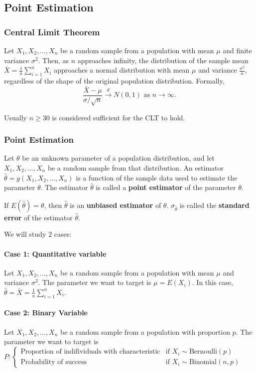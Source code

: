 \subsection{Point Estimation}
\hrulefill

\subsubsection*{Central Limit Theorem}
Let \(X_1, X_2, \ldots, X_n\) be a random sample from a population with mean \(\mu\) and finite variance \(\sigma^2\). 
Then, as \(n\) approaches infinity, the distribution of the sample mean \(\bar{X} = \frac{1}{n} \sum_{i=1}^{n} X_i\) 
approaches a normal distribution with mean \(\mu\) and variance \(\frac{\sigma^2}{n}\), regardless of the shape of the 
original population distribution. Formally,
\[
\frac{\bar{X} - \mu}{\sigma / \sqrt{n}} \xrightarrow{d} N(0, 1) \text{ as } n \to \infty.
\]

Usually $n \geq 30$ is considered sufficient for the CLT to hold.

\subsubsection*{Point Estimation}
Let $\theta$ be an unknown parameter of a population distribution, and let $X_1, X_2, \ldots, X_n$ be a random sample from that distribution.
An estimator $\hat{\theta} = g(X_1, X_2, \ldots, X_n)$ is a function of the sample data used to estimate the parameter $\theta$.
The estimator $\hat{\theta}$ is called a \textbf{point estimator} of the parameter $\theta$.

If $E(\hat{\theta}) = \theta$, then $\hat{\theta}$ is an \textbf{unbiased estimator} of $\theta$. $\sigma_{\hat{\theta}}$ is called the
\textbf{standard error} of the estimator $\hat{\theta}$.

We will study 2 cases:

\paragraph*{Case 1: Quantitative variable}
Let \(X_1, X_2, \ldots, X_n\) be a random sample from a population with mean \(\mu\) and variance \(\sigma^2\).
The parameter we want to target is $\mu = E(X_i)$. In this case, $\hat{\theta} = \bar{X} = \frac{1}{n} \sum_{i=1}^n X_i$.

\paragraph*{Case 2: Binary Variable}
Let \(X_1, X_2, \ldots, X_n\) be a random sample from a population with proportion \(p\).
The parameter we want to target is $P : \begin{cases}
    \text{Proportion of indifividuals with characteristic} & \text{if } X_i \sim \text{Bernoulli}(p) \\
    \text{Probability of success} & \text{if } X_i \sim \text{Binomial}(n, p)
\end{cases}$

